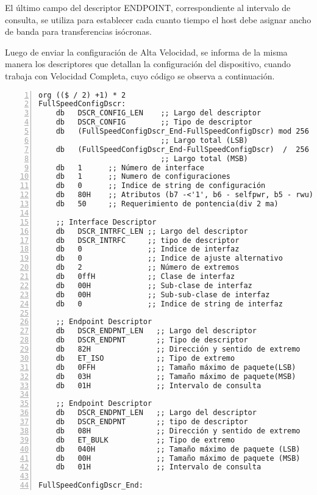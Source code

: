 	El último campo del descriptor ENDPOINT, correspondiente al intervalo de consulta, se utiliza para establecer cada cuanto tiempo el host debe asignar ancho de banda para transferencias isócronas.
	
	Luego de enviar la configuración de Alta Velocidad, se informa de la misma manera los descriptores que detallan la configuración del dispositivo, cuando trabaja con Velocidad Completa, cuyo código se observa a continuación.
	
	\begin{lstlisting}[language={[x86masm]Assembler},backgroundcolor=\color{gray!30},numbers=left]
org (($ / 2) +1) * 2
FullSpeedConfigDscr:
	db   DSCR_CONFIG_LEN	;; Largo del descriptor
	db   DSCR_CONFIG        ;; Tipo de descriptor
	db   (FullSpeedConfigDscr_End-FullSpeedConfigDscr) mod 256
							;; Largo total (LSB)
	db   (FullSpeedConfigDscr_End-FullSpeedConfigDscr)  /  256 
							;; Largo total (MSB)
	db   1      ;; Número de interface
	db   1      ;; Numero de configuraciones
	db   0      ;; Indice de string de configuración
	db   80H    ;; Atributos (b7 -<'1', b6 - selfpwr, b5 - rwu)
	db   50     ;; Requerimiento de pontencia(div 2 ma)
	
	;; Interface Descriptor
	db   DSCR_INTRFC_LEN ;; Largo del descriptor
	db   DSCR_INTRFC     ;; tipo de descriptor
	db   0               ;; Indice de interfaz
	db   0               ;; Indice de ajuste alternativo
	db   2               ;; Número de extremos
	db   0ffH            ;; Clase de interfaz
	db   00H             ;; Sub-clase de interfaz
	db   00H             ;; Sub-sub-clase de interfaz
	db   0               ;; Indice de string de interfaz
	
	;; Endpoint Descriptor
	db   DSCR_ENDPNT_LEN   ;; Largo del descriptor
	db   DSCR_ENDPNT       ;; Tipo de descriptor
	db   82H               ;; Dirección y sentido de extremo
	db   ET_ISO            ;; Tipo de extremo
	db   0FFH              ;; Tamaño máximo de paquete(LSB)
	db   03H               ;; Tamaño máximo de paquete(MSB)
	db   01H               ;; Intervalo de consulta
	
	;; Endpoint Descriptor
	db   DSCR_ENDPNT_LEN   ;; Largo del descriptor
	db   DSCR_ENDPNT       ;; tipo de descriptor
	db   08H               ;; Dirección y sentido de extremo
	db   ET_BULK           ;; Tipo de extremo
	db   040H              ;; Tamaño máximo de paquete (LSB)
	db   00H               ;; Tamaño máximo de paquete (MSB)
	db   01H               ;; Intervalo de consulta
	
FullSpeedConfigDscr_End:
	\end{lstlisting}

